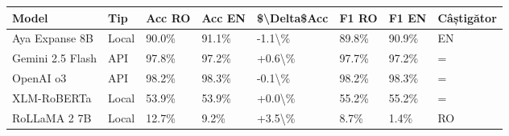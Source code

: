 \begin{tabular}{llllllll}
\toprule
 Model            & Tip   & Acc RO   & Acc EN   & \$\textbackslash{}Delta\$Acc   & F1 RO   & F1 EN   & Câștigător   \\
\midrule
 Aya Expanse 8B   & Local & 90.0\%    & 91.1\%    & -1.1\textbackslash{}\%        & 89.8\%   & 90.9\%   & EN           \\
 Gemini 2.5 Flash & API   & 97.8\%    & 97.2\%    & +0.6\textbackslash{}\%        & 97.7\%   & 97.2\%   & =            \\
 OpenAI o3        & API   & 98.2\%    & 98.3\%    & -0.1\textbackslash{}\%        & 98.2\%   & 98.3\%   & =            \\
 XLM-RoBERTa      & Local & 53.9\%    & 53.9\%    & +0.0\textbackslash{}\%        & 55.2\%   & 55.2\%   & =            \\
 RoLLaMA 2 7B     & Local & 12.7\%    & 9.2\%     & +3.5\textbackslash{}\%        & 8.7\%    & 1.4\%    & RO           \\
\bottomrule
\end{tabular}